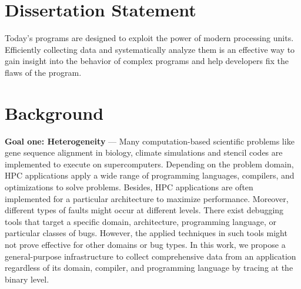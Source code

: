 \section{Dissertation Statement}
Today's programs are designed to exploit the power of modern processing units. Efficiently collecting data and systematically analyze them is an effective way to gain insight into the behavior of complex programs and help developers fix the flaws of the program.
\section{Background}
\par{ \textbf{Goal one: Heterogeneity} ---
Many computation-based scientific problems like gene sequence alignment in biology, climate simulations and stencil codes are implemented to execute on supercomputers.
%
Depending on the problem domain, HPC applications apply a wide range of programming languages, compilers, and optimizations to solve problems.
%
Besides, HPC applications are often implemented for a particular architecture to maximize performance.
%
Moreover, different types of faults might occur at different levels.
%
There exist debugging tools that target a specific domain, architecture, programming language, or particular classes of bugs.
%
However, the applied techniques in such tools might not prove effective for other domains or bug types.
%
In this work, we propose a general-purpose infrastructure to collect comprehensive data from an application regardless of its domain, compiler, and programming language by tracing at the binary level.
%
}
